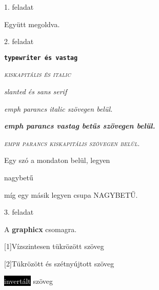 \documentclass{article}
\begin{document}
\begin{large}

1. feladat \par
\end{large}

Együtt megoldva. \\

\begin{large}
2. feladat \par
\end{large}

\texttt{\textbf{typewriter és vastag} } \par
\textsc{\textit{kiskapitális és italic} } \par
\textsl{\textsf{slanted és sans serif} } \par

\textit{\emph{emph parancs italic szövegen belül.} } \par
\textbf{\emph{emph parancs vastag betűs szövegen belül.} } \par
\textsc{\emph{emph parancs kiskapitális szövegen belül.} } \par
Egy szó a mondaton belül, legyen \begin{large}nagybetű\end{large} míg egy másik  legyen csupa \MakeUppercase{nagybetű}.\\

\begin{large}
3. feladat \par
\end{large}
A \textbf{graphicx} csomagra.\par
\scalebox{-1}[1]{Vízszintesen tükrözött szöveg} \par
\framebox{ \scalebox{-1}[1]{Bekeretezett vízszintesen tükrözött szöveg} } \par
\scalebox{-1}[2]{Tükrözött és szétnyújtott szöveg}

 \par
{} \par
\textcolor{white}{\colorbox{black} {invertált}} szöveg \par
{}
\end{document}
